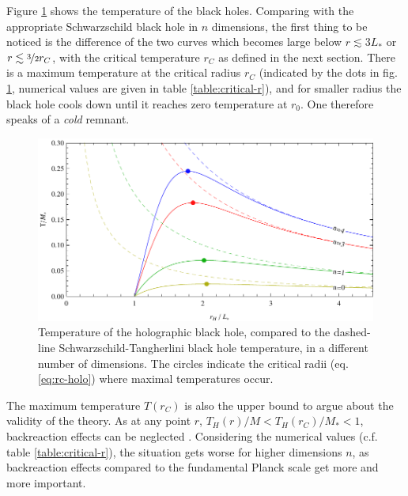 \documentclass[12pt,a4paper]{report}
\numberwithin{equation}{chapter}
\begin{document}
Figure \ref{fig:T-holo} shows the temperature of the black holes. Comparing with the appropriate Schwarz\-schild black hole in $n$ dimensions, the first thing to be noticed is the difference of the two curves which becomes large below $r \lesssim 3L_*$ or $r \lesssim \nicefrac 32 r_C$, with the critical temperature $r_C$ as defined in the next section. There is a maximum temperature at the critical radius $r_C$ (indicated by the dots in fig. \ref{fig:T-holo}, numerical values are given in table \ref{table:critical-r}), and for smaller radius the black hole cools down until it reaches zero temperature at $r_0$. One therefore speaks of a \emph{cold} remnant. 

\begin{figure}[h!]
\includegraphics[scale=1]{figures/temperature-plot-holography-n.pdf}
\caption[Holographic metric temperature plot]{Temperature of the holographic black hole, compared to the dashed-line Schwarzschild-Tangherlini black hole temperature, in a different number of dimensions. The circles indicate the critical radii (eq. \ref{eq:rc-holo}) where maximal temperatures occur.}\label{fig:T-holo}
\end{figure}

The maximum temperature $T(r_C)$ is also the upper bound to argue about the validity of the theory. As at any point $r$, $T_H(r)/M < T_H(r_C)/M_* < 1$, backreaction effects can be neglected \cite{NS2013}. Considering the numerical values (c.f. table \ref{table:critical-r}), the situation gets worse for higher dimensions $n$, as backreaction effects compared to the fundamental Planck scale get more and more important.
\end{document}
